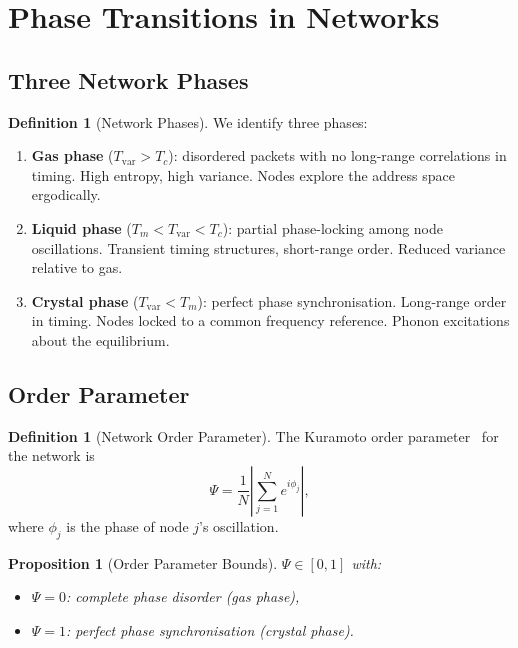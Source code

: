 \documentclass[11pt,twocolumn,a4paper]{article}
\newtheorem{proposition}[theorem]{Proposition}
\theoremstyle{definition}
\newtheorem{definition}[theorem]{Definition}
\theoremstyle{remark}
\newcommand{\Tvar}{T_{\mathrm{var}}}
\begin{document}
\section{Phase Transitions in Networks}\label{sec:phase}

\subsection{Three Network Phases}\label{sec:three_phases}

\begin{definition}[Network Phases]\label{def:phases}
We identify three phases:
\begin{enumerate}[label=(\roman*)]
  \item \textbf{Gas phase} ($\Tvar>T_c$): disordered packets with no
        long-range correlations in timing.  High entropy, high variance.
        Nodes explore the address space ergodically.
  \item \textbf{Liquid phase} ($T_m<\Tvar<T_c$): partial phase-locking
        among node oscillations.  Transient timing structures, short-range
        order.  Reduced variance relative to gas.
  \item \textbf{Crystal phase} ($\Tvar<T_m$): perfect phase synchronisation.
        Long-range order in timing.  Nodes locked to a common frequency
        reference.  Phonon excitations about the equilibrium.
\end{enumerate}
\end{definition}

\subsection{Order Parameter}\label{sec:order_parameter}

\begin{definition}[Network Order Parameter]\label{def:order}
The Kuramoto order parameter~\cite{Kuramoto1975} for the network is
\begin{equation}\label{eq:order}
  \Psi = \frac{1}{N}\left|\sum_{j=1}^{N}e^{i\phi_j}\right|,
\end{equation}
where $\phi_j$ is the phase of node $j$'s oscillation.
\end{definition}

\begin{proposition}[Order Parameter Bounds]\label{prop:order_bounds}
$\Psi\in[0,1]$ with:
\begin{itemize}
  \item $\Psi=0$: complete phase disorder (gas phase),
  \item $\Psi=1$: perfect phase synchronisation (crystal phase).
\end{itemize}
\end{proposition}
\end{document}
